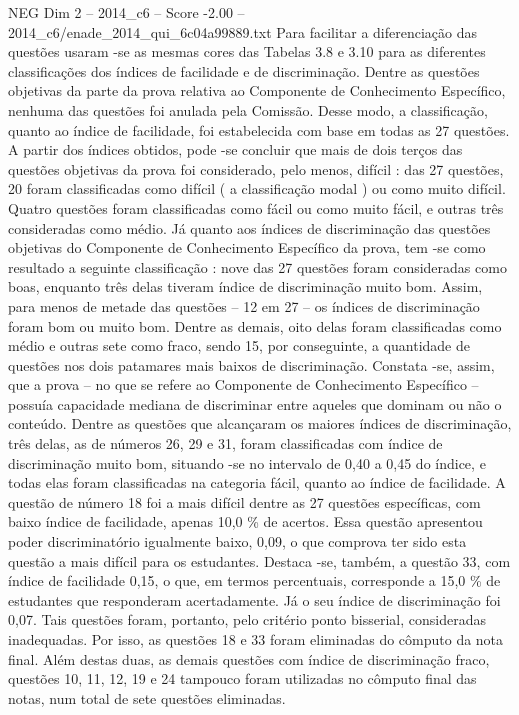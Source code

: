 \begin{textsample}{NEG Dim 2 – 2014\_c6 – Score -2.00 – 2014\_c6/enade\_2014\_qui\_6c04a99889.txt}
Para facilitar a diferenciação das questões usaram -se as mesmas cores das Tabelas 3.8 e 3.10 para as diferentes classificações dos índices de facilidade e de discriminação.
Dentre as questões objetivas da parte da prova relativa ao Componente de Conhecimento Específico, nenhuma das questões foi anulada pela Comissão.
Desse modo, a classificação, quanto ao índice de facilidade, foi estabelecida com base em todas as 27 questões.
A partir dos índices obtidos, pode -se concluir que mais de dois terços das questões objetivas da prova foi considerado, pelo menos, difícil : das 27 questões, 20 foram classificadas como difícil ( a classificação modal ) ou como muito difícil.
Quatro questões foram classificadas como fácil ou como muito fácil, e outras três consideradas como médio.
Já quanto aos índices de discriminação das questões objetivas do Componente de Conhecimento Específico da prova, tem -se como resultado a seguinte classificação : nove das 27 questões foram consideradas como boas, enquanto três delas tiveram índice de discriminação muito bom.
Assim, para menos de metade das questões – 12 em 27 – os índices de discriminação foram bom ou muito bom.
Dentre as demais, oito delas foram classificadas como médio e outras sete como fraco, sendo 15, por conseguinte, a quantidade de questões nos dois patamares mais baixos de discriminação.
Constata -se, assim, que a prova – no que se refere ao Componente de Conhecimento Específico – possuía capacidade mediana de discriminar entre aqueles que dominam ou não o conteúdo.
Dentre as questões que alcançaram os maiores índices de discriminação, três delas, as de números 26, 29 e 31, foram classificadas com índice de discriminação muito bom, situando -se no intervalo de 0,40 a 0,45 do índice, e todas elas foram classificadas na categoria fácil, quanto ao índice de facilidade.
A questão de número 18 foi a mais difícil dentre as 27 questões específicas, com baixo índice de facilidade, apenas 10,0 \% de acertos.
Essa questão apresentou poder discriminatório igualmente baixo, 0,09, o que comprova ter sido esta questão a mais difícil para os estudantes.
Destaca -se, também, a questão 33, com índice de facilidade 0,15, o que, em termos percentuais, corresponde a 15,0 \% de estudantes que responderam acertadamente.
Já o seu índice de discriminação foi 0,07.
Tais questões foram, portanto, pelo critério ponto bisserial, consideradas inadequadas.
Por isso, as questões 18 e 33 foram eliminadas do cômputo da nota final.
Além destas duas, as demais questões com índice de discriminação fraco, questões 10, 11, 12, 19 e 24 tampouco foram utilizadas no cômputo final das notas, num total de sete questões eliminadas.

\end{textsample}
